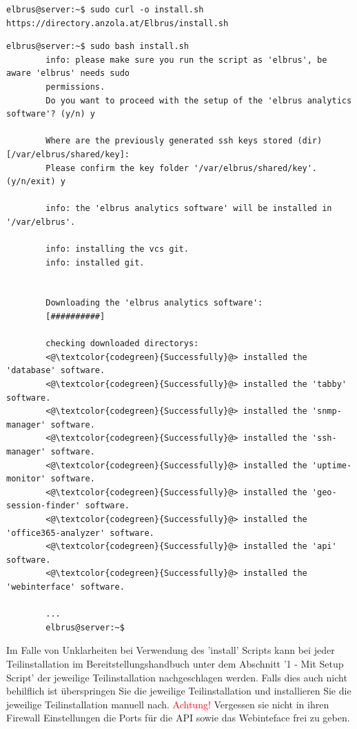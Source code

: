 \documentclass{article}
\begin{document}
	\lstset{style=commands}
	\begin{lstlisting}[caption={Installieren des 'install' Script.}]
		elbrus@server:~$ sudo curl -o install.sh https://directory.anzola.at/Elbrus/install.sh
	\end{lstlisting}

	\begin{lstlisting}[caption={Ausführen des 'install' Script.}]
		elbrus@server:~$ sudo bash install.sh
		info: please make sure you run the script as 'elbrus', be aware 'elbrus' needs sudo 
		permissions.
		Do you want to proceed with the setup of the 'elbrus analytics software'? (y/n) y
		
		Where are the previously generated ssh keys stored (dir) [/var/elbrus/shared/key]:
		Please confirm the key folder '/var/elbrus/shared/key'. (y/n/exit) y
		
		info: the 'elbrus analytics software' will be installed in '/var/elbrus'.
		
		info: installing the vcs git.
		info: installed git.
		
		
		Downloading the 'elbrus analytics software':
		[##########]
		
		checking downloaded directorys:
		<@\textcolor{codegreen}{Successfully}@> installed the 'database' software.
		<@\textcolor{codegreen}{Successfully}@> installed the 'tabby' software.
		<@\textcolor{codegreen}{Successfully}@> installed the 'snmp-manager' software.
		<@\textcolor{codegreen}{Successfully}@> installed the 'ssh-manager' software.
		<@\textcolor{codegreen}{Successfully}@> installed the 'uptime-monitor' software.
		<@\textcolor{codegreen}{Successfully}@> installed the 'geo-session-finder' software.
		<@\textcolor{codegreen}{Successfully}@> installed the 'office365-analyzer' software.
		<@\textcolor{codegreen}{Successfully}@> installed the 'api' software.
		<@\textcolor{codegreen}{Successfully}@> installed the 'webinterface' software.
		
		...
		elbrus@server:~$
	\end{lstlisting}
	Im Falle von Unklarheiten bei Verwendung des 'install' Scripts kann bei jeder Teilinstallation im Bereitstellungshandbuch unter dem Abschnitt '1 - Mit Setup Script' der jeweilige Teilinstallation nachgeschlagen werden. Falls dies auch nicht behilflich ist überspringen Sie die jeweilige Teilinstallation und installieren Sie die jeweilige Teilinstallation manuell nach.
	\newline \newline \newline \newline \newline \newline \newline \newline \newline \newline \newline
	\textcolor{red}{Achtung!} Vergessen sie nicht in ihren Firewall Einstellungen die Ports für die API sowie das Webinteface frei zu geben.
	\newpage
	
\end{document}
